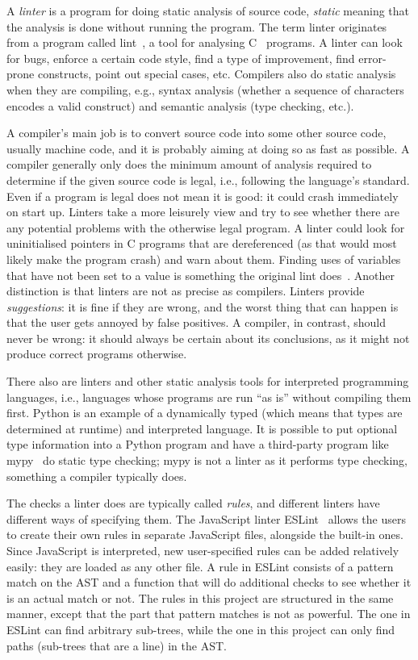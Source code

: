 \documentclass[a4paper,12pt]{article}
\begin{document}
A \emph{linter} is a program for doing static analysis of source code, \emph{static} meaning that
the analysis is done without running the program. The term linter originates from a
program called lint~\cite{lint}, a tool for analysing C~\cite{c1978} programs. A linter can look for
bugs, enforce a certain code style, find a type of improvement, find error-prone
constructs, point out special cases, etc. Compilers also do static analysis when they are
compiling, e.g., syntax analysis (whether a sequence of characters encodes a valid
construct) and semantic analysis (type checking, etc.).

A compiler's main job is to convert source code into some other source code, usually machine
code, and it is probably aiming at doing so as fast as possible. A compiler generally only
does the minimum amount of analysis required to determine if the given source code is
legal, i.e., following the language's standard. Even if a program is legal does not mean
it is good: it could crash immediately on start up. Linters take a more leisurely view and
try to see whether there are any potential problems with the otherwise legal program. A
linter could look for uninitialised pointers in C programs that are dereferenced (as that would
most likely make the program crash) and warn about them. Finding uses of variables that
have not been set to a value is something the original lint does~\cite{lint}. Another
distinction is that linters are not as precise as compilers. Linters provide
\emph{suggestions}: it is fine if they are wrong, and the worst thing that can happen is that
the user gets annoyed by false positives. A compiler, in contrast, should never be wrong: it
should always be certain about its conclusions, as it might not produce correct programs
otherwise.

There also are linters and other static analysis tools for
interpreted programming languages, i.e., languages whose programs are run ``as is'' without compiling them first. Python
is an example of a dynamically typed (which means that types are determined at runtime) and interpreted
language. It is possible to put optional type information into a Python program and have a
third-party program like mypy~\cite{mypy} do static type checking; mypy is not
a linter as it performs type checking, something a compiler typically does.

The checks a linter does are typically called \emph{rules}, and different linters have
different ways of specifying them. The JavaScript linter ESLint~\cite{ESLint} allows the users
to create their own rules in separate JavaScript files, alongside the built-in ones.
Since JavaScript is interpreted, new user-specified rules can be added relatively easily:
they are loaded as any other file.
A rule in ESLint
consists of a pattern match on the AST and a function
that will do additional checks to see whether it is an actual match or not.
The rules in this project are structured in the same
manner, except that the part that pattern matches is not as powerful. The one in ESLint can
find arbitrary sub-trees, while the one in this project can only find paths (sub-trees that
are a line) in the AST.
\end{document}
